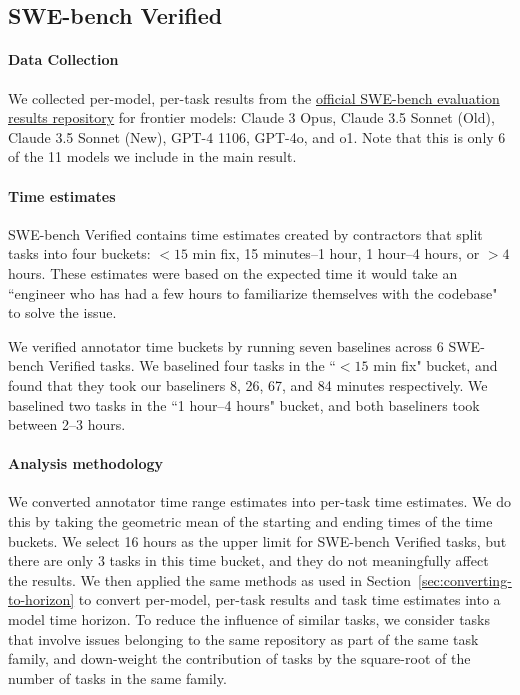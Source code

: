 \documentclass{article}
\begin{document}
\subsection{SWE-bench Verified} \label{app:swe-bench}


\label{app:swe-bench-methods}
\paragraph{Data Collection}
We collected per-model, per-task results from the \href{https://github.com/swe-bench/experiments/}{official SWE-bench evaluation results repository} for frontier models: Claude 3 Opus, Claude 3.5 Sonnet (Old), Claude 3.5 Sonnet (New),  GPT-4 1106, GPT-4o, and o1. Note that this is only 6 of the 11 models we include in the main result.

\paragraph{Time estimates} SWE-bench Verified contains time estimates created by contractors that split tasks into four buckets: $<15$ min fix, 15 minutes--1 hour, 1 hour--4 hours, or $>4$ hours. These estimates were based on the expected time it would take an ``engineer who has had a few hours to familiarize themselves with the codebase" to solve the issue.

We verified annotator time buckets by running seven baselines across 6 SWE-bench Verified tasks. We baselined four tasks in the ``$<15$ min fix" bucket, and found that they took our baseliners 8, 26, 67, and 84 minutes respectively.  We baselined two tasks in the ``1 hour--4 hours" bucket, and both baseliners took between 2--3 hours. 

\paragraph{Analysis methodology}
We converted annotator time range estimates into per-task time estimates. We do this by taking the geometric mean of the starting and ending times of the time buckets. We select 16 hours as the upper limit for SWE-bench Verified tasks, but there are only 3 tasks in this time bucket, and they do not meaningfully affect the results. We then applied the same methods as used in Section~\ref{sec:converting-to-horizon} to convert per-model, per-task results and task time estimates into a model time horizon. 
To reduce the influence of similar tasks, we consider tasks that involve issues belonging to the same repository as part of the same task family, and down-weight the contribution of tasks by the square-root of the number of tasks in the same family. 
\end{document}

